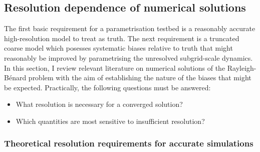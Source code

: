 \documentclass[titlepage,twoside]{article}
\numberwithin{equation}{section}
\newcommand{\rb}{Rayleigh-B\'{e}nard}
\begin{document}
\subsection{Resolution dependence of numerical solutions}
The first basic requirement for a parametrisation testbed is a reasonably accurate high-resolution model to treat as truth. The next requirement is a truncated coarse model which posesses systematic biases relative to truth that might reasonably be improved by parametrising the unresolved subgrid-scale dynamics. In this section, I review relevant literature on numerical solutions of the \rb{} problem with the aim of
establishing the nature of the biases that might be expected. Practically, the following questions must be answered:
\begin{itemize}
    \item What resolution is necessary for a converged solution?
    \item Which quantities are most sensitive to insufficient resolution?
\end{itemize}


\subsubsection{Theoretical resolution requirements for accurate simulations}%
\label{sec:res_requirements}
\end{document}
